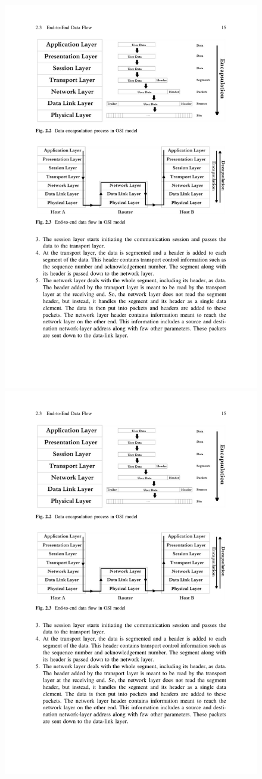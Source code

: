 \documentclass[../report.tex]{subfiles}
\begin{document}
\begin{figure}[H]
\centering
\includegraphics[width=0.8\linewidth]{figures/encapsulation.pdf} \\
\vspace{0.5cm}
\includegraphics[width=0.8\linewidth]{figures/endtoendflow.pdf}

\end{figure}
\end{document}
